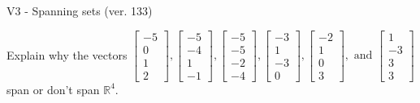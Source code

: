 \begin{exercise}
  \begin{exerciseTitle}V3 - Spanning sets (ver. 133)\end{exerciseTitle}
  \begin{exerciseStatement}
    Explain why the vectors \(\left[\begin{array}{r}
-5 \\
0 \\
1 \\
2
\end{array}\right] , \left[\begin{array}{r}
-5 \\
-4 \\
1 \\
-1
\end{array}\right] , \left[\begin{array}{r}
-5 \\
-5 \\
-2 \\
-4
\end{array}\right] , \left[\begin{array}{r}
-3 \\
1 \\
-3 \\
0
\end{array}\right] , \left[\begin{array}{r}
-2 \\
1 \\
0 \\
3
\end{array}\right] , \text{ and } \left[\begin{array}{r}
1 \\
-3 \\
3 \\
3
\end{array}\right]\) span or don't span \(\mathbb{R}^4\). 
	



\end{exerciseStatement}
\end{exercise}
